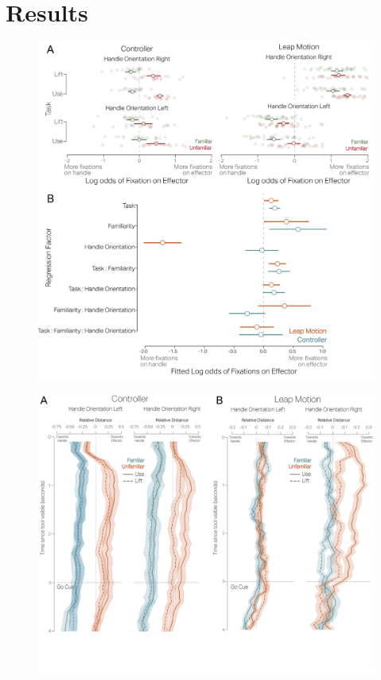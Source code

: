 \section{Results}

\begin{figure}[H]
    \centering
    \includegraphics[width=1\linewidth]{source/figures/result/results_combined_logodds.png} \\
    \caption[]{}
    \label{figure:log_odds}
\end{figure}


\begin{figure}[H]
    \centering
    \includegraphics[width=0.7\linewidth]{source/figures/result/deviation_from_center.png} \\
    \caption[]{}
    \label{figure:dev_from_center}
\end{figure}

